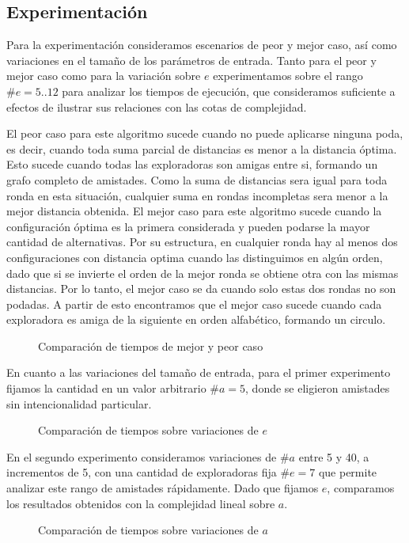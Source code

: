 \subsection{Experimentación}

Para la experimentación consideramos escenarios de peor y mejor caso, así como variaciones en el tamaño de los parámetros de entrada.
Tanto para el peor y mejor caso como para la variación sobre $e$ experimentamos sobre el rango $\#e = 5..12$ para analizar los tiempos de ejecución, que consideramos suficiente a efectos de ilustrar sus relaciones con las cotas de complejidad.

El peor caso para este algoritmo sucede cuando no puede aplicarse ninguna poda, es decir, cuando toda suma parcial de distancias es menor a la distancia óptima.
Esto sucede cuando todas las exploradoras son amigas entre si, formando un grafo completo de amistades. Como la suma de distancias sera igual para toda ronda en esta situación, cualquier suma en rondas incompletas sera menor a la mejor distancia obtenida.
El mejor caso para este algoritmo sucede cuando la configuración óptima es la primera considerada y pueden podarse la mayor cantidad de alternativas.
Por su estructura, en cualquier ronda hay al menos dos configuraciones con distancia optima cuando las distinguimos en algún orden, dado que si se invierte el orden de la mejor ronda se obtiene otra con las mismas distancias. 
Por lo tanto, el mejor caso se da cuando solo estas dos rondas no son podadas.
A partir de esto encontramos que el mejor caso sucede cuando cada exploradora es amiga de la siguiente en orden alfabético, formando un circulo.
\begin{figure}[H]

\caption{Comparación de tiempos de mejor y peor caso}
\end{figure}

\newpage

En cuanto a las variaciones del tamaño de entrada, para el primer experimento fijamos la cantidad en un valor arbitrario $\#a = 5$, donde se eligieron amistades sin intencionalidad particular.
\begin{figure}[H]

\caption{Comparación de tiempos sobre variaciones de $e$}
\end{figure}

En el segundo experimento consideramos variaciones de $\#a$ entre 5 y 40, a incrementos de 5, con una cantidad de exploradoras fija $\#e = 7$ que permite analizar este rango de amistades rápidamente. Dado que fijamos $e$, comparamos los resultados obtenidos con la complejidad lineal sobre $a$.

\begin{figure}[H]

\caption{Comparación de tiempos sobre variaciones de $a$}
\end{figure}







